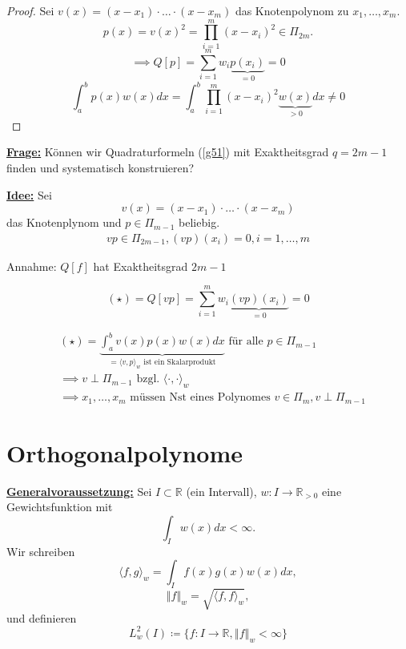 \documentclass{book}
\def\R{\mathbb{R}}
\begin{document}
            \begin{proof}
                Sei $v(x)=(x-x_1)\cdot\dots\cdot(x-x_m)$ das Knotenpolynom zu $x_1,\dots,x_m$.
                \[p(x)=v(x)^2=\prod_{i=1}^m(x-x_i)^2\in\Pi_{2m}.\]
                \[\implies Q[p]=\sum_{i=1}^m w_i \underbrace{p(x_i)}_{=0}=0\]
                \[\int_a^b p(x)w(x)dx=\int_a^b\prod_{i=1}^m(x-x_i)^2 \underbrace{w(x)}_{>0}dx\neq 0\]
            \end{proof}

            \underline{\textbf{Frage:}} Können wir Quadraturformeln (\ref{g51}) mit Exaktheitsgrad $q=2m-1$ finden 
            und systematisch konstruieren?

            \underline{\textbf{Idee:}} Sei 
            \[v(x)=(x-x_1)\cdot\dots\cdot(x-x_m)\] 
            das Knotenplynom und $p\in\Pi_{m-1}$ beliebig.
            \begin{align*}
                vp\in\Pi_{2m-1}, (vp)(x_i)=0,i=1,\dots,m
            \end{align*}

            Annahme: $Q[f]$ hat Exaktheitsgrad $2m-1$

            \begin{equation*}
               (\star) = Q[vp]=\sum_{i=1}^m w_i\underbrace{(vp)(x_i)}_{=0} =0
            \end{equation*}

            \begin{align*}
                &(\star) = \underbrace{\int_a^b v(x)p(x)w(x)dx}_{=\langle v,p \rangle_w \text{ ist ein Skalarprodukt}} \text{ für alle } p\in\Pi_{m-1}\\
                &\implies v\perp \Pi_{m-1} \text{ bzgl. } \langle \cdot,\cdot \rangle_w\\
                &\implies x_1,\dots,x_m \text{ müssen Nst eines Polynomes } v \in \Pi_m, v \perp \Pi_{m-1}
            \end{align*}

        \section{Orthogonalpolynome}

            \underline{\textbf{Generalvoraussetzung:}} Sei $I\subset \R$ (ein Intervall), $w:I\to\R_{>0}$ eine Gewichtsfunktion mit 
            \[\int_I w(x)dx<\infty.\]
            Wir schreiben 
            \[\langle f,g \rangle_w=\int_I f(x)g(x)w(x)dx,\]
            \[\left\Vert f \right\Vert_w=\sqrt{\langle f,f \rangle_w},\]
            und definieren 
            \[L_w^2(I)\coloneqq \{f:I\to\R,\left\Vert f \right\Vert_w<\infty\}\]
\end{document}
